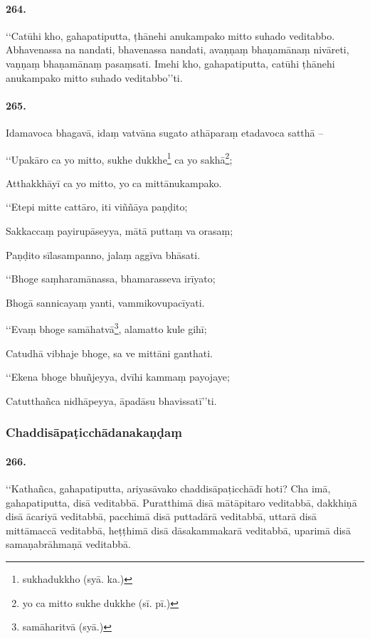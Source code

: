 \paragraph{264.} ‘‘Catūhi kho, gahapatiputta, ṭhānehi anukampako mitto suhado veditabbo. Abhavenassa na nandati, bhavenassa nandati, avaṇṇaṃ bhaṇamānaṃ nivāreti, vaṇṇaṃ bhaṇamānaṃ pasaṃsati. Imehi kho, gahapatiputta, catūhi ṭhānehi anukampako mitto suhado veditabbo’’ti.

\paragraph{265.} Idamavoca bhagavā, idaṃ vatvāna sugato athāparaṃ etadavoca satthā –

‘‘Upakāro ca yo mitto, sukhe dukkhe\footnote{sukhadukkho (syā. ka.)} ca yo sakhā\footnote{yo ca mitto sukhe dukkhe (sī. pī.)};

Atthakkhāyī ca yo mitto, yo ca mittānukampako.

‘‘Etepi mitte cattāro, iti viññāya paṇḍito;

Sakkaccaṃ payirupāseyya, mātā puttaṃ va orasaṃ;

Paṇḍito sīlasampanno, jalaṃ aggīva bhāsati.

‘‘Bhoge saṃharamānassa, bhamarasseva irīyato;

Bhogā sannicayaṃ yanti, vammikovupacīyati.

‘‘Evaṃ bhoge samāhatvā\footnote{samāharitvā (syā.)}, alamatto kule gihī;

Catudhā vibhaje bhoge, sa ve mittāni ganthati.

‘‘Ekena bhoge bhuñjeyya, dvīhi kammaṃ payojaye;

Catutthañca nidhāpeyya, āpadāsu bhavissatī’’ti.

\subsubsection{Chaddisāpaṭicchādanakaṇḍaṃ}

\paragraph{266.} ‘‘Kathañca, gahapatiputta, ariyasāvako chaddisāpaṭicchādī hoti? Cha imā, gahapatiputta, disā veditabbā. Puratthimā disā mātāpitaro veditabbā, dakkhiṇā disā ācariyā veditabbā, pacchimā disā puttadārā veditabbā, uttarā disā mittāmaccā veditabbā, heṭṭhimā disā dāsakammakarā veditabbā, uparimā disā samaṇabrāhmaṇā veditabbā.

